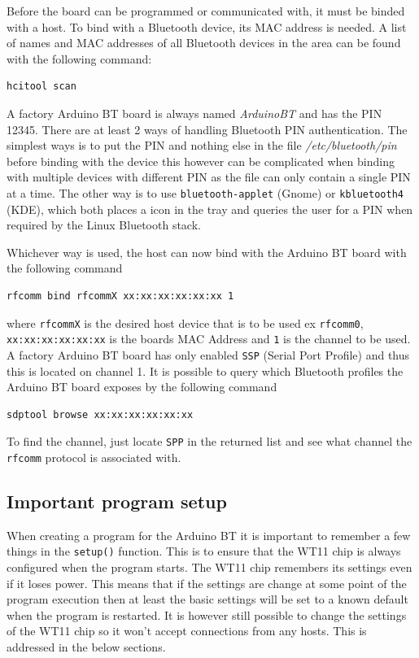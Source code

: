 \documentclass[a4paper, oneside, final]{memoir}
\begin{document}
Before the board can be programmed or communicated with, it must be binded with
a host. To bind with a Bluetooth device, its MAC address is needed. A list of
names and MAC addresses of all Bluetooth devices in the area can be found with
the following command:

\begin{verbatim}
hcitool scan
\end{verbatim}

A factory Arduino BT board is always named \textit{ArduinoBT} and has the PIN
12345. There are at least 2 ways of handling Bluetooth PIN authentication. The
simplest ways is to put the PIN and nothing else in the file
\textit{/etc/bluetooth/pin} before binding with the device this however can be
complicated when binding with multiple devices with different PIN as the file
can only contain a single PIN at a time. The other way is to use
\texttt{bluetooth-applet} (Gnome) or \texttt{kbluetooth4} (KDE), which both
places a icon in the tray and queries the user for a PIN when required by the
Linux Bluetooth stack.

Whichever way is used, the host can now bind with the Arduino BT board with the
following command

\begin{verbatim}
rfcomm bind rfcommX xx:xx:xx:xx:xx:xx 1
\end{verbatim}

where \texttt{rfcommX} is the desired host device that is to be used ex
\texttt{rfcomm0}, \texttt{xx:xx:xx:xx:xx:xx} is the boards MAC Address and
\texttt{1} is the channel to be used. A factory Arduino BT board has only
enabled \texttt{SSP} (Serial Port Profile) and thus this is located on channel
1. It is possible to query which Bluetooth profiles the Arduino BT board exposes
by the following command

\begin{verbatim}
sdptool browse xx:xx:xx:xx:xx:xx
\end{verbatim}

To find the channel, just locate \texttt{SPP} in the returned list and see what
channel the \texttt{rfcomm} protocol is associated with.

\subsection{Important program setup}

When creating a program for the Arduino BT it is important to remember a few
things in the \texttt{setup()} function. This is to ensure that the WT11 chip is
always configured when the program starts. The WT11 chip remembers its settings
even if it loses power. This means that if the settings are change at some point
of the program execution then at least the basic settings will be set to a known
default when the program is restarted. It is however still possible to change
the settings of the WT11 chip so it won't accept connections from any
hosts. This is addressed in the below sections.
\end{document}
